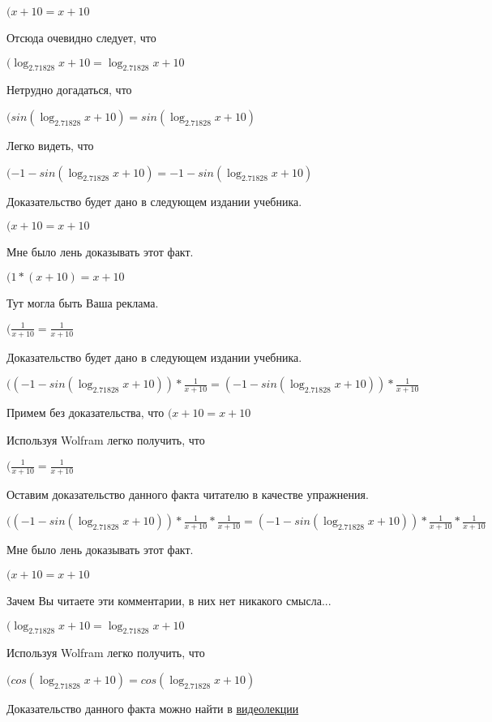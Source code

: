 \documentclass[12pt,a4paper,fleqn]{article}
\theoremstyle{definition}
\begin{document}
$( x  +  10  =  x  +  10 $

Отсюда очевидно следует, что

$(\log_{ 2.71828 }{ x  +  10 } = \log_{ 2.71828 }{ x  +  10 }$

Нетрудно догадаться, что

$(sin(\log_{ 2.71828 }{ x  +  10 }) = sin(\log_{ 2.71828 }{ x  +  10 })$

Легко видеть, что

$( -1  - sin(\log_{ 2.71828 }{ x  +  10 }) =  -1  - sin(\log_{ 2.71828 }{ x  +  10 })$

Доказательство будет дано в следующем издании учебника.

$( x  +  10  =  x  +  10 $

Мне было лень доказывать этот факт.

$( 1  * ( x  +  10 ) =  x  +  10 $

Тут могла быть Ваша реклама.

$(\frac{ 1 }{ x  +  10 }
 = \frac{ 1 }{ x  +  10 }
$

Доказательство будет дано в следующем издании учебника.

$(( -1  - sin(\log_{ 2.71828 }{ x  +  10 })) * \frac{ 1 }{ x  +  10 }
 = ( -1  - sin(\log_{ 2.71828 }{ x  +  10 })) * \frac{ 1 }{ x  +  10 }
$

Примем без доказательства, что
$( x  +  10  =  x  +  10 $

Используя Wolfram легко получить, что

$(\frac{ 1 }{ x  +  10 }
 = \frac{ 1 }{ x  +  10 }
$

Оставим доказательство данного факта читателю в качестве упражнения.

$(( -1  - sin(\log_{ 2.71828 }{ x  +  10 })) * \frac{ 1 }{ x  +  10 }
 * \frac{ 1 }{ x  +  10 }
 = ( -1  - sin(\log_{ 2.71828 }{ x  +  10 })) * \frac{ 1 }{ x  +  10 }
 * \frac{ 1 }{ x  +  10 }
$

Мне было лень доказывать этот факт.

$( x  +  10  =  x  +  10 $

Зачем Вы читаете эти комментарии, в них нет никакого смысла...

$(\log_{ 2.71828 }{ x  +  10 } = \log_{ 2.71828 }{ x  +  10 }$

Используя Wolfram легко получить, что

$(cos(\log_{ 2.71828 }{ x  +  10 }) = cos(\log_{ 2.71828 }{ x  +  10 })$

Доказательство данного факта можно найти в \href{https://www.youtube.com/watch?v=dQw4w9WgXcQ}{видеолекции}
\end{document}

